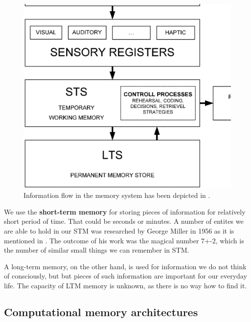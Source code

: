 \begin{figure}
  \centering                                
  \includegraphics[scale=0.5]{diagrams/usedalgorithms/atkinson-memory.eps}    
  \caption{Information flow in the memory system has been depicted in \cite{Atkinson:controlofrtm}.}
  \label{usedalgorithms:qttv}
\end{figure}

We use the {\bf short-term memory} for storing pieces of information for relatively short period of time. That could be seconds or minutes. A number of entites we are able to hold in our STM was researched by George Miller in 1956 as it is mentioned in \cite{Sternberg:congitivepsychology}. The outcome of his work was the magical number 7+-2, which is the number of similar small things we can remember in STM.

A long-term memory, on the other hand, is used for information we do not think of consciously, but but pieces of such information are important for our everyday life. The capacity of LTM memory is unknown, as there is no way how to find it. 
                                               
\subsection{Computational memory architectures}

